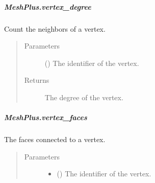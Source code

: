 \documentclass[letterpaper,10pt,english]{sphinxmanual}
\begin{document}
\begin{fulllineitems}
\subparagraph{MeshPlus.vertex\_degree}
\label{\detokenize{api/generated/directional_clustering.mesh.MeshPlus.vertex_degree:meshplus-vertex-degree}}\label{\detokenize{api/generated/directional_clustering.mesh.MeshPlus.vertex_degree::doc}}

\begin{fulllineitems}
\label{\detokenize{api/generated/directional_clustering.mesh.MeshPlus.vertex_degree:directional_clustering.mesh.MeshPlus.vertex_degree}}
Count the neighbors of a vertex.
\begin{quote}\begin{description}
\item[{Parameters}] \leavevmode
{} () \textendash{} The identifier of the vertex.

\item[{Returns}] \leavevmode
{} \textendash{} The degree of the vertex.

\end{description}\end{quote}

\end{fulllineitems}



\subparagraph{MeshPlus.vertex\_faces}
\label{\detokenize{api/generated/directional_clustering.mesh.MeshPlus.vertex_faces:meshplus-vertex-faces}}\label{\detokenize{api/generated/directional_clustering.mesh.MeshPlus.vertex_faces::doc}}

\begin{fulllineitems}
\label{\detokenize{api/generated/directional_clustering.mesh.MeshPlus.vertex_faces:directional_clustering.mesh.MeshPlus.vertex_faces}}
The faces connected to a vertex.
\begin{quote}\begin{description}
\item[{Parameters}] \leavevmode\begin{itemize}
\item {} 
 () \textendash{} The identifier of the vertex.


\end{itemize}
\end{description}
\end{quote}
\end{fulllineitems}
\end{fulllineitems}
\end{document}
